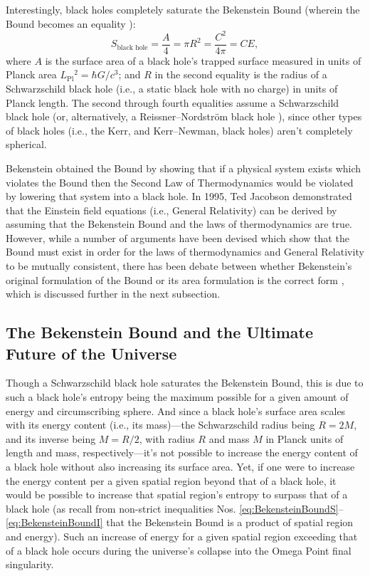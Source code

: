 \documentclass[letterpaper,12pt]{article}
\begin{document}
Interestingly, black holes completely saturate the Bekenstein Bound (wherein the Bound becomes an equality \cite{Bekenstein2008b}): \begin{equation}
S_{\text{black hole}} = \frac{A}{4} = \pi R^2 = \frac{C^2}{4\pi} = C E,
\label{eq:BekensteinBoundBH}
\end{equation} where \( A \) is the surface area of a black hole's trapped surface measured in units of Planck area \( L_\text{Pl}{}^2 = \hbar G/c^3 \); and \( R \) in the second equality is the radius of a Schwarzschild black hole (i.e., a static black hole with no charge) in units of Planck length. The second through fourth equalities assume a Schwarzschild black hole (or, alternatively, a Reissner--Nordstr\"{o}m black hole \cite{Bekenstein1993}), since other types of black holes (i.e., the Kerr, and Kerr--Newman, black holes) aren't completely spherical.

Bekenstein obtained the Bound by showing that if a physical system exists which violates the Bound then the Second Law of Thermodynamics would be violated by lowering that system into a black hole. In 1995, Ted Jacobson \cite{Jacobson1995} demonstrated that the Einstein field equations (i.e., General Relativity) can be derived by assuming that the Bekenstein Bound and the laws of thermodynamics are true. However, while a number of arguments have been devised which show that the Bound must exist in order for the laws of thermodynamics and General Relativity to be mutually consistent, there has been debate between whether Bekenstein's original formulation of the Bound or its area formulation is the correct form \cite{Bousso1999-5,Bousso1999-6,Bousso1999-11,Bousso2002,BoussoEtAl2003,Bekenstein2000-3,Bekenstein2003-8,Bekenstein2003-11,Bekenstein2004,Bekenstein2008a,Tipler2005}, which is discussed further in the next subsection.

\subsection{The Bekenstein Bound and the Ultimate Future of the Universe}
\label{subsec:BekensteinBoundUltimateFutureUniverse}

Though a Schwarzschild black hole saturates the Bekenstein Bound, this is due to such a black hole's entropy being the maximum possible for a given amount of energy and circumscribing sphere. And since a black hole's surface area scales with its energy content (i.e., its mass)---the Schwarzschild radius being \( R = 2 M \), and its inverse being \( M = R/2 \), with radius \( R \) and mass \( M \) in Planck units of length and mass, respectively---it's not possible to increase the energy content of a black hole without also increasing its surface area. Yet, if one were to increase the energy content per a given spatial region beyond that of a black hole, it would be possible to increase that spatial region's entropy to surpass that of a black hole (as recall from non-strict inequalities Nos. \ref{eq:BekensteinBoundS}--\ref{eq:BekensteinBoundI} that the Bekenstein Bound is a product of spatial region and energy). Such an increase of energy for a given spatial region exceeding that of a black hole occurs during the universe's collapse into the Omega Point final singularity.
\end{document}
